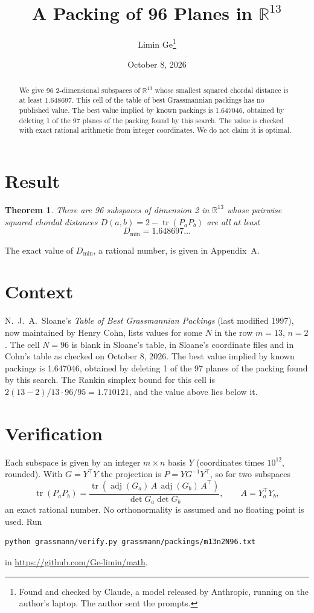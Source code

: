 \documentclass[11pt,a4paper]{article}
\title{A Packing of 96 Planes in $\mathbb{R}^{13}$}
\author{Limin Ge\thanks{Found and checked by Claude, a model released by Anthropic, running on the author's laptop. The author sent the prompts.}}
\date{October 8, 2026}
\newtheorem*{theorem}{Theorem}
\begin{document}
\maketitle
\begin{abstract}
We give 96 2-dimensional subspaces of $\mathbb{R}^{13}$ whose smallest squared chordal distance is at least 1.648697. This cell of the table of best Grassmannian packings has no published value. The best value implied by known packings is 1.647046, obtained by deleting 1 of the 97 planes of the packing found by this search. The value is checked with exact rational arithmetic from integer coordinates. We do not claim it is optimal.
\end{abstract}

\section{Result}
\begin{theorem}
There are 96 subspaces of dimension 2 in $\mathbb{R}^{13}$ whose pairwise squared chordal distances $D(a,b) = 2 - \operatorname{tr}(P_aP_b)$ are all at least
\[ D_{\min} = 1.648697\ldots \]
\end{theorem}
The exact value of $D_{\min}$, a rational number, is given in Appendix~A.


\section{Context}
N.~J.~A.~Sloane's \emph{Table of Best Grassmannian Packings} (last modified 1997), now maintained by Henry Cohn, lists values for some $N$ in the row $m=13$, $n=2$. The cell $N=96$ is blank in Sloane's table, in Sloane's coordinate files and in Cohn's table as checked on October 8, 2026. The best value implied by known packings is 1.647046, obtained by deleting 1 of the 97 planes of the packing found by this search. The Rankin simplex bound for this cell is $2(13-2)/13\cdot 96/95 = 1.710121$, and the value above lies below it.


\section{Verification}
Each subspace is given by an integer $m\times n$ basis $Y$ (coordinates times $10^{12}$, rounded). With $G=Y^\top Y$ the projection is $P=YG^{-1}Y^\top$, so for two subspaces
\[ \operatorname{tr}(P_aP_b)=\frac{\operatorname{tr}(\operatorname{adj}(G_a)\,A\,\operatorname{adj}(G_b)\,A^\top)}{\det G_a\det G_b},\qquad A=Y_a^\top Y_b, \]
an exact rational number. No orthonormality is assumed and no floating point is used. Run
\begin{verbatim}
python grassmann/verify.py grassmann/packings/m13n2N96.txt
\end{verbatim}
in \url{https://github.com/Ge-limin/math}.
\end{document}
